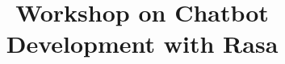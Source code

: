 \documentclass[xcolor=dvipsnames,compress,t,pdf,9pt]{beamer}
\title[\insertframenumber /\inserttotalframenumber]{Workshop on Chatbot Development with Rasa}
\begin{document}
	\begin{frame}
	\titlepage
	\end{frame}
	
%	
	
	
\end{document}
